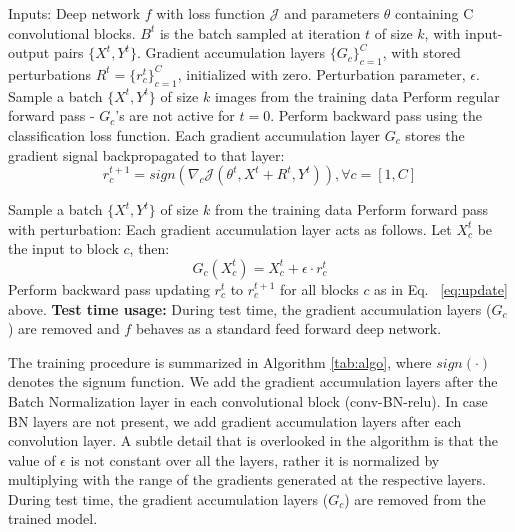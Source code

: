 \begin{algorithm*}[!htb]
\caption{Efficient layerwise adversarial training procedure for improved regularization}\label{alg:algo}
\label{tab:algo}
\begin{algorithmic}[1]
\State Inputs: Deep network $f$ with loss function $\mathcal{J}$ and parameters $\theta$ containing C convolutional blocks. ${B^t}$ is the batch sampled at iteration $t$ of size $k$, with input-output pairs $\{X^{t},Y^{t}\}$. Gradient accumulation layers $\{G_c\}_{c=1}^{C}$, with stored perturbations $R^t=\{r^{t}_c\}_{c=1}^{C}$, initialized with zero. Perturbation parameter, $\epsilon$.
		\State Sample a batch $\{X^t,Y^t\}$ of size $k$ images from the training data
        \State Perform regular forward pass - $G_c$'s are not active for $t=0$.
        \State Perform backward pass using the classification loss function. Each gradient accumulation layer $G_{c}$ stores the gradient signal backpropagated to that layer:
        \begin{equation}
        r^{t+1}_c = sign(\nabla_{c}\mathcal{J}(\theta^t,X^t+R^t,Y^t)),  \forall c = [1,C]
        \label{eq:update}
        \end{equation}
		
		\State Sample a batch $\{X^t,Y^t\}$ of size $k$ from the training data
        \State Perform forward pass with perturbation: Each gradient accumulation layer acts as follows. \noindent Let $X^{t}_{c}$ be the input to block $c$, then:
        \begin{equation}
        		G_c(X^{t}_{c})=X^{t}_{c}+\epsilon \cdot r^{t}_c
         \end{equation}
        \State Perform backward pass updating $r^{t}_c$ to $r^{t+1}_c$ for all blocks $c$ as in Eq. ~\ref{eq:update} above.
\EndFor
\State \textbf{Test time usage:} During test time, the gradient accumulation layers ($G_c$) are removed and $f$ behaves as a standard feed forward deep network.
\end{algorithmic}
\end{algorithm*}

 The training procedure is summarized in Algorithm \ref{tab:algo}, where $sign(\cdot)$ denotes the signum function. We add the gradient accumulation layers after the Batch Normalization layer in each convolutional block (conv-BN-relu). In case BN layers are not present, we add gradient accumulation layers after each convolution layer. A subtle detail that is overlooked in the algorithm is that the value of $\epsilon$ is not constant over all the layers, rather it is normalized by multiplying with the range of the gradients generated at the respective layers. During test time, the gradient accumulation layers ($G_c$) are removed from the trained model.
 
